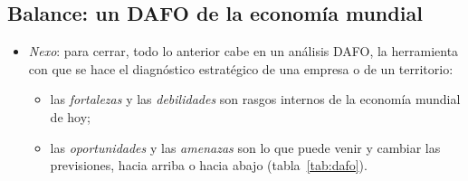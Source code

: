 \documentclass[11pt]{article}
\begin{document}
\subsection{Balance: un DAFO de la economía mundial}\label{sec:dafo}

\begin{itemize}
\item \emph{Nexo}: para cerrar, todo lo anterior cabe en un análisis DAFO, la herramienta con que se hace el diagnóstico estratégico de una empresa o de un territorio:
  \begin{itemize}
  \item las \emph{fortalezas} y las \emph{debilidades} son rasgos internos de la economía mundial de hoy;
  \item las \emph{oportunidades} y las \emph{amenazas} son lo que puede venir y cambiar las previsiones, hacia arriba o hacia abajo (tabla~\ref{tab:dafo}).
  \end{itemize}
\end{itemize}
\end{document}

